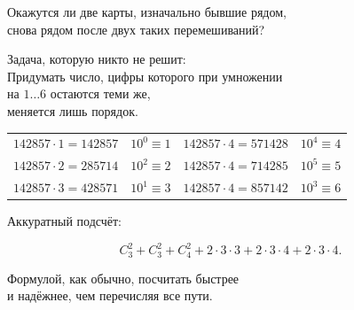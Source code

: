 Окажутся ли две карты, изначально бывшие рядом,\\
снова рядом после двух таких перемешиваний?


Задача, которую никто не решит:\\
Придумать число, цифры которого при умножении\\
на \( 1\ldots 6 \) остаются теми же,\\
меняется лишь порядок.

{\small
\begin{center}\begin{tabular}{llll}
   $142857 \cdot 1 = 142857$ & $10^0 \equiv 1$ & $142857 \cdot 4 = 571428$ & $10^4 \equiv 4$ \\
   $142857 \cdot 2 = 285714$ & $10^2 \equiv 2$ & $142857 \cdot 4 = 714285$ & $10^5 \equiv 5$ \\
   $142857 \cdot 3 = 428571$ & $10^1 \equiv 3$ & $142857 \cdot 4 = 857142$ & $10^3 \equiv 6$ \\
\end{tabular}\end{center}}


Аккуратный подсчёт: \begin{center}  \end{center} \vspace{-8mm}

\[C_3^2 + C_3^2 + C_4^2 +
	2 \cdot 3 \cdot 3 + 2 \cdot 3 \cdot 4 + 2 \cdot 3 \cdot 4.\] \vspace{-8mm}

Формулой, как обычно, посчитать быстрее\\ и надёжнее, чем перечисляя все пути.
